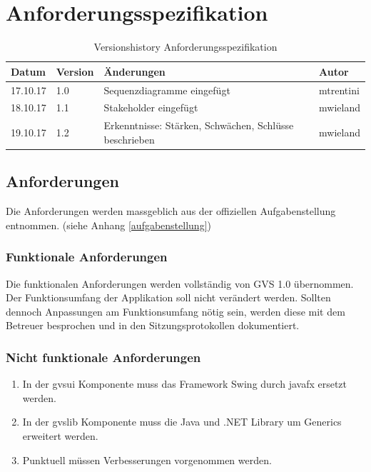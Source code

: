 \documentclass[11pt,a4paper,english,oneside]{book}
\numberwithin{equation}{chapter}
\begin{document}
	
	
	
	\chapter{Anforderungsspezifikation}
	
	\begin{table}[h!]
		\centering
		\begin{tabularx}{\linewidth}{l l X l}
			\toprule 
			Datum & Version & Änderungen & Autor \\
			\midrule
			17.10.17 & 1.0 & Sequenzdiagramme eingefügt & mtrentini \\
			18.10.17 & 1.1 & Stakeholder eingefügt & mwieland \\
			19.10.17 & 1.2 & Erkenntnisse: Stärken, Schwächen, Schlüsse beschrieben & mwieland \\
			\bottomrule 
		\end{tabularx} 
		\caption{Versionshistory Anforderungsspezifikation} 
	\end{table}
	
	
	
	\section{Anforderungen} \label{sec:functionalreq}
	Die Anforderungen werden massgeblich aus der offiziellen Aufgabenstellung entnommen. (siehe Anhang \ref{aufgabenstellung})
	
	\subsection{Funktionale Anforderungen}
	Die funktionalen Anforderungen werden vollständig von GVS 1.0 \cite{gvs1} übernommen. Der Funktionsumfang der Applikation soll nicht verändert werden. Sollten dennoch Anpassungen am Funktionsumfang nötig sein, werden diese mit dem Betreuer besprochen und in den Sitzungsprotokollen dokumentiert.
	
	\subsection{Nicht funktionale Anforderungen}
	
	\begin{enumerate}
		\item In der \gls{gvsui} Komponente muss das Framework Swing durch \gls{javafx} ersetzt werden.
		\item In der \gls{gvslib} Komponente muss die Java und .NET Library um Generics erweitert werden. 
		\item Punktuell müssen Verbesserungen vorgenommen werden.
	\end{enumerate}
\end{document}
